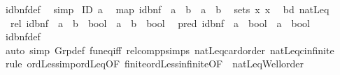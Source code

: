 \begin{isabellebody}
%
\isatagproof
{}\isamarkupfalse%
\ id{\isacharunderscore}{\kern0pt}bnf{\isacharunderscore}{\kern0pt}def\ \isamarkupfalse%
\ simp%
\endisatagproof
{\isafoldproof}%
%
\isadelimproof
\isanewline
%
\endisadelimproof
\isanewline
{}\isamarkupfalse%
\ ID{\isacharcolon}{\kern0pt}\ {\isacharprime}{\kern0pt}a\isanewline
\ \ map{\isacharcolon}{\kern0pt}\ {\isachardoublequoteopen}id{\isacharunderscore}{\kern0pt}bnf\ {\isacharcolon}{\kern0pt}{\isacharcolon}{\kern0pt}\ {\isacharparenleft}{\kern0pt}{\isacharprime}{\kern0pt}a\ {\isasymRightarrow}\ {\isacharprime}{\kern0pt}b{\isacharparenright}{\kern0pt}\ {\isasymRightarrow}\ {\isacharprime}{\kern0pt}a\ {\isasymRightarrow}\ {\isacharprime}{\kern0pt}b{\isachardoublequoteclose}\isanewline
\ \ sets{\isacharcolon}{\kern0pt}\ {\isachardoublequoteopen}{\isasymlambda}x{\isachardot}{\kern0pt}\ {\isacharbraceleft}{\kern0pt}x{\isacharbraceright}{\kern0pt}{\isachardoublequoteclose}\isanewline
\ \ bd{\isacharcolon}{\kern0pt}\ natLeq\isanewline
\ \ rel{\isacharcolon}{\kern0pt}\ {\isachardoublequoteopen}id{\isacharunderscore}{\kern0pt}bnf\ {\isacharcolon}{\kern0pt}{\isacharcolon}{\kern0pt}\ {\isacharparenleft}{\kern0pt}{\isacharprime}{\kern0pt}a\ {\isasymRightarrow}\ {\isacharprime}{\kern0pt}b\ {\isasymRightarrow}\ bool{\isacharparenright}{\kern0pt}\ {\isasymRightarrow}\ {\isacharprime}{\kern0pt}a\ {\isasymRightarrow}\ {\isacharprime}{\kern0pt}b\ {\isasymRightarrow}\ bool{\isachardoublequoteclose}\isanewline
\ \ pred{\isacharcolon}{\kern0pt}\ {\isachardoublequoteopen}id{\isacharunderscore}{\kern0pt}bnf\ {\isacharcolon}{\kern0pt}{\isacharcolon}{\kern0pt}\ {\isacharparenleft}{\kern0pt}{\isacharprime}{\kern0pt}a\ {\isasymRightarrow}\ bool{\isacharparenright}{\kern0pt}\ {\isasymRightarrow}\ {\isacharprime}{\kern0pt}a\ {\isasymRightarrow}\ bool{\isachardoublequoteclose}\isanewline
%
\isadelimproof
\ \ %
\endisadelimproof
%
\isatagproof
{}\isamarkupfalse%
\ id{\isacharunderscore}{\kern0pt}bnf{\isacharunderscore}{\kern0pt}def\isanewline
\ \ \isamarkupfalse%
\ {\isacharparenleft}{\kern0pt}auto\ simp{\isacharcolon}{\kern0pt}\ Grp{\isacharunderscore}{\kern0pt}def\ fun{\isacharunderscore}{\kern0pt}eq{\isacharunderscore}{\kern0pt}iff\ relcompp{\isachardot}{\kern0pt}simps\ natLeq{\isacharunderscore}{\kern0pt}card{\isacharunderscore}{\kern0pt}order\ natLeq{\isacharunderscore}{\kern0pt}cinfinite{\isacharparenright}{\kern0pt}\isanewline
\ \ \isamarkupfalse%
\ {\isacharparenleft}{\kern0pt}rule\ ordLess{\isacharunderscore}{\kern0pt}imp{\isacharunderscore}{\kern0pt}ordLeq{\isacharbrackleft}{\kern0pt}OF\ finite{\isacharunderscore}{\kern0pt}ordLess{\isacharunderscore}{\kern0pt}infinite{\isacharbrackleft}{\kern0pt}OF\ {\isacharunderscore}{\kern0pt}\ natLeq{\isacharunderscore}{\kern0pt}Well{\isacharunderscore}{\kern0pt}order{\isacharbrackright}{\kern0pt}{\isacharbrackright}{\kern0pt}{\isacharparenright}{\kern0pt}\isanewline

\end{isabellebody}
